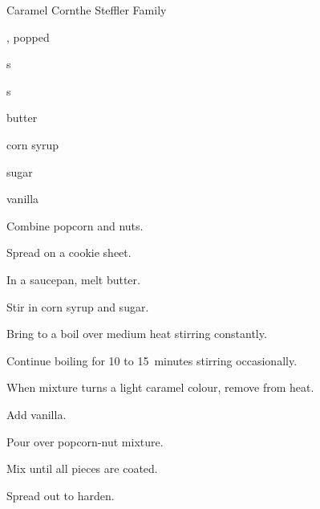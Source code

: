 \begin{recipe}{Caramel Corn}{the Steffler Family}{}

\begin{ingredients}
\item {} , popped
\item \C{\half} s
\item \C{\half} s
\item \C{\half} butter
\item \C{\quarter} corn syrup
\item \C{\twothird} sugar
\item {} vanilla
\end{ingredients}

\begin{directions}
\item Combine popcorn and nuts.
\item Spread on a cookie sheet.
\item In a saucepan, melt butter.
\item Stir in corn syrup and sugar.
\item Bring to a boil over medium heat stirring constantly.
\item Continue boiling for 10 to 15~minutes stirring occasionally.
\item When mixture turns a light caramel colour, remove from heat.
\item Add vanilla.
\item Pour over popcorn-nut mixture.
\item Mix until all pieces are coated.
\item Spread out to harden.
\end{directions}
\end{recipe}
